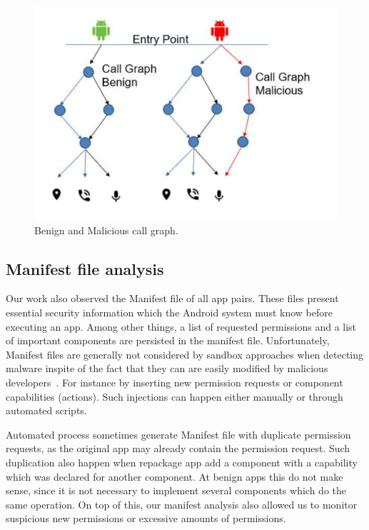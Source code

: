 \begin{figure}[ht]
\centering
\includegraphics[scale=0.25]{images/maliciousCallGraph.pdf}
\caption{Benign and Malicious call graph.}
 \label{fig:callGraph}
\end{figure}


\subsection{Manifest file analysis}\label{sec:manifestAnalysis}

Our work also observed the Manifest file of all app pairs. These files present essential security information which the Android system must know before executing an app. Among other things, a  list of requested permissions and a list of important components are persisted in the manifest file. Unfortunately, Manifest files are generally not considered by sandbox approaches when detecting malware inspite of the fact that they can are easily modified by malicious developers~\cite{DBLP:journals/corr/abs-1208-4536}. For instance by inserting new permission requests or component capabilities (actions). Such injections can happen either manually or through automated scripts.

Automated process sometimes generate Manifest file with duplicate permission requests, as the original app may already contain the permission request. Such duplication also happen when repackage app add a component with a capability which was declared for another component. At benign apps this do not make sense, since it is not necessary to implement several components which do the same operation. On top of this, our manifest analysis also allowed us to monitor suspicious new permissions or excessive amounts of permissions. 

